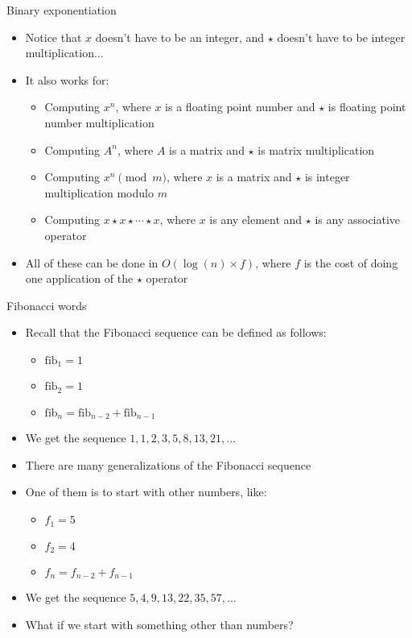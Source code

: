 \documentclass[12pt,t]{beamer}
\newcommand{\bi}{\begin{itemize}}
\newcommand{\ei}{\end{itemize}}
\begin{document}
\begin{frame}{Binary exponentiation}
    \vspace{20pt}
    \bi
        \item Notice that $x$ doesn't have to be an integer, and $\star$ doesn't have to be integer multiplication...
        \item It also works for:
            \bi
                \item Computing $x^n$, where $x$ is a floating point number and $\star$ is floating point number multiplication
                \item Computing $A^n$, where $A$ is a matrix and $\star$ is matrix multiplication
                \item Computing $x^n \pmod{m}$, where $x$ is a matrix and $\star$ is integer multiplication modulo $m$
                \item Computing $x\star x\star \cdots \star x$, where $x$ is any element and $\star$ is any associative operator
            \ei

        \item All of these can be done in $O(\log(n) \times f)$, where $f$ is the cost of doing one application of the $\star$ operator
    \ei
\end{frame}

\begin{frame}{Fibonacci words}
    \bi
        \item Recall that the Fibonacci sequence can be defined as follows:
            \bi
        \item $\mathrm{fib}_1 = 1$
        \item $\mathrm{fib}_2 = 1$
        \item $\mathrm{fib}_n = \mathrm{fib}_{n-2} + \mathrm{fib}_{n-1}$
            \ei
        \item We get the sequence $1, 1, 2, 3, 5, 8, 13, 21, \ldots$
        \vspace{10pt}
        \item There are many generalizations of the Fibonacci sequence
        \item One of them is to start with other numbers, like:
            \bi
                \item $f_1 = 5$
                \item $f_2 = 4$
                \item $f_n = f_{n-2} + f_{n-1}$
            \ei
        \item We get the sequence $5, 4, 9, 13, 22, 35, 57, \ldots$
        \vspace{10pt}
        \item What if we start with something other than numbers?
    \ei
\end{frame}
\end{document}
